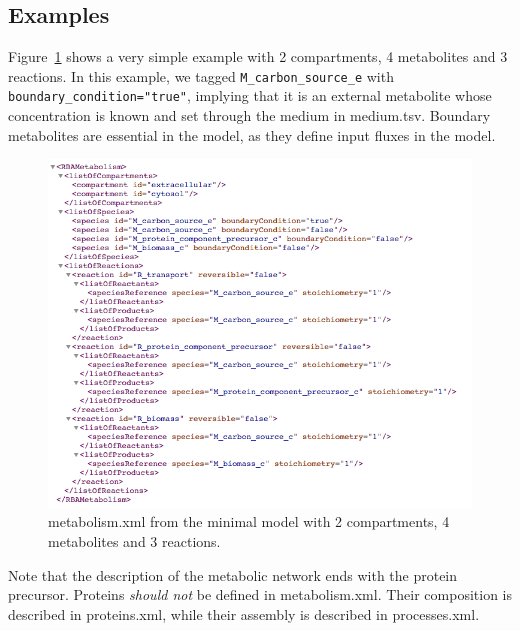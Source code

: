 \subsection{Examples}

Figure~\ref{fig:metabolism_ex_1} shows a very simple example with 2 compartments,
4 metabolites and 3 reactions.
In this example, we tagged \texttt{M\_carbon\_source\_e} with \texttt{boundary\_condition="true"},
implying that it is an external metabolite whose concentration is known and set through the
medium in medium.tsv.
Boundary metabolites are essential in the model, as they define input fluxes in the model.

\begin{figure}
  \includegraphics[scale=0.6]{figures/metabolism_ex_1}
  \caption{metabolism.xml from the minimal model with 2 compartments,
  4 metabolites and 3 reactions.}
\label{fig:metabolism_ex_1}
\end{figure}

Note that the description of the metabolic network ends with the protein precursor.
Proteins \emph{should not} be defined in metabolism.xml.
Their composition is described in proteins.xml, while their assembly is described in processes.xml.
